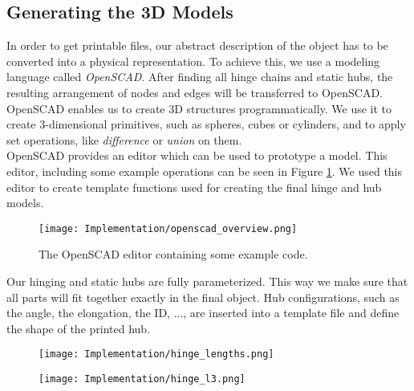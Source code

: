 \subsection{Generating the 3D Models}\label{sec:openscad_impl}
In order to get printable files, our abstract description of the object has to be converted into a physical representation. To achieve this, we use a modeling language called \textit{OpenSCAD}. After finding all hinge chains and static hubs, the resulting arrangement of nodes and edges will be transferred to OpenSCAD. OpenSCAD enables us to create 3D structures programmatically. We use it to create 3-dimensional primitives, such as spheres, cubes or cylinders, and to apply set operations, like \textit{difference} or \textit{union} on them.\\
OpenSCAD provides an editor which can be used to prototype a model. This editor, including some example operations can be seen in Figure \ref{fig:openscad_overview}. We used this editor to create template functions used for creating the final hinge and hub models.\\
\begin{figure}[ht!]
    \texttt{[image: Implementation/openscad\_overview.png]}
    \centering
    \caption{The OpenSCAD editor containing some example code.}
    \label{fig:openscad_overview}
\end{figure}
Our hinging and static hubs are fully parameterized. This way we make sure that all parts will fit together exactly in the final object. Hub configurations, such as the angle, the elongation, the ID, ..., are inserted into a template file and define the shape of the printed hub.

\begin{figure}[ht]
  \centering
  \begin{minipage}[t]{5cm}
    \centering
    \texttt{[image: Implementation/hinge\_lengths.png]}
    \label{fig:leg_asset}
  \end{minipage}%
  \vspace{3cm}
  \begin{minipage}[t]{5cm}
    \centering
    \texttt{[image: Implementation/hinge\_l3.png]}
    \label{fig:spider_in_progress}
  \end{minipage}
\end{figure}
